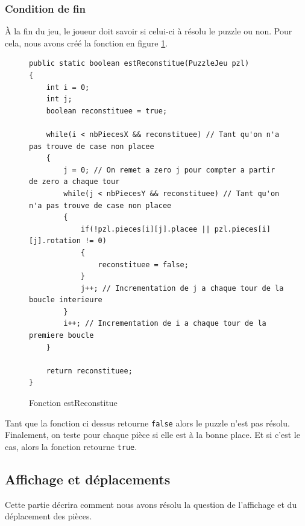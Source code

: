 \documentclass[]{article}
\newcommand{\variable}[1]{\noindent \texttt{#1}}
\begin{document}
\subsubsection{Condition de fin}

À la fin du jeu, le joueur doit savoir si celui-ci à résolu le puzzle ou non. Pour cela, nous avons créé la fonction en figure \no\ref{Fonction  estReconstitue}.

\begin{figure}[hpt]
	\center
	\caption{\label{Fonction  estReconstitue} Fonction  estReconstitue}
\begin{lstlisting}
public static boolean estReconstitue(PuzzleJeu pzl)
{
    int i = 0;
    int j;
    boolean reconstituee = true;

    while(i < nbPiecesX && reconstituee) // Tant qu'on n'a pas trouve de case non placee
    {
        j = 0; // On remet a zero j pour compter a partir de zero a chaque tour
        while(j < nbPiecesY && reconstituee) // Tant qu'on n'a pas trouve de case non placee
        {
            if(!pzl.pieces[i][j].placee || pzl.pieces[i][j].rotation != 0)
            {
                reconstituee = false;
            }
            j++; // Incrementation de j a chaque tour de la boucle interieure
        }
        i++; // Incrementation de i a chaque tour de la premiere boucle
    }

    return reconstituee;
}
\end{lstlisting}
\end{figure}

Tant que la fonction ci dessus retourne \variable{false} alors le puzzle n'est pas résolu. Finalement, on teste pour chaque pièce si elle est à la bonne place. Et si c'est le cas, alors la fonction retourne \variable{true}. 






\subsection{Affichage et déplacements}

Cette partie décrira comment nous avons résolu la question de l'affichage et du déplacement des pièces.
\end{document}
